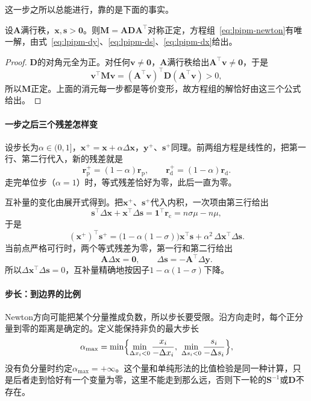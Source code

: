 这一步之所以总能进行，靠的是下面的事实。

\begin{lemma}[Newton方程可解]
\label{lem:lpipm-newton-solvable}
设$\bm{A}$满行秩，$\bm{x},\bm{s}>\bm{0}$。则$\bm{M}=\bm{A}\bm{D}\bm{A}^\top$对称正定，方程组~\eqref{eq:lpipm-newton}有唯一解，由式~\eqref{eq:lpipm-dy}、\eqref{eq:lpipm-ds}、\eqref{eq:lpipm-dx}给出。
\end{lemma}

\begin{proof}
$\bm{D}$的对角元全为正。对任何$\bm{v}\neq\bm{0}$，$\bm{A}$满行秩给出$\bm{A}^\top\bm{v}\neq\bm{0}$，于是
\[
 \bm{v}^\top\bm{M}\bm{v}=(\bm{A}^\top\bm{v})^\top\bm{D}(\bm{A}^\top\bm{v})>0,
\]
所以$\bm{M}$正定。上面的消元每一步都是等价变形，故方程组的解恰好由这三个公式给出。
\end{proof}

\paragraph{一步之后三个残差怎样变}
设步长为$\alpha\in(0,1]$，$\bm{x}^+=\bm{x}+\alpha\Delta\bm{x}$，$\bm{y}^+$、$\bm{s}^+$同理。前两组方程是线性的，把第一行、第二行代入，新的残差就是
\begin{equation}
 \bm{r}_{\mathrm{p}}^+=(1-\alpha)\bm{r}_{\mathrm{p}},\qquad\bm{r}_{\mathrm{d}}^+=(1-\alpha)\bm{r}_{\mathrm{d}}.
 \label{eq:lpipm-residual-update}
\end{equation}
走完单位步（$\alpha=1$）时，等式残差恰好为零，此后一直为零。

互补量的变化由展开式得到。把$\bm{x}^+$、$\bm{s}^+$代入内积，一次项由第三行给出
\[
 \bm{s}^\top\Delta\bm{x}+\bm{x}^\top\Delta\bm{s}=\bm{1}^\top\bm{r}_{\mathrm{c}}=n\sigma\mu-n\mu,
\]
于是
\begin{equation}
 (\bm{x}^+)^\top\bm{s}^+=\bigl(1-\alpha(1-\sigma)\bigr)\bm{x}^\top\bm{s}+\alpha^2\,\Delta\bm{x}^\top\Delta\bm{s}.
 \label{eq:lpipm-comp-update}
\end{equation}
当前点严格可行时，两个等式残差为零，第一行和第二行给出
\[
 \bm{A}\Delta\bm{x}=\bm{0},\qquad\Delta\bm{s}=-\bm{A}^\top\Delta\bm{y}.
\]
所以$\Delta\bm{x}^\top\Delta\bm{s}=0$，互补量精确地按因子$1-\alpha(1-\sigma)$下降。

\paragraph{步长：到边界的比例}
Newton方向可能把某个分量推成负数，所以步长要受限。沿方向走时，每个正分量到零的距离是确定的。定义能保持非负的最大步长
\begin{equation}
 \alpha_{\max}=\min\Bigl\{\min_{\Delta x_i<0}\frac{x_i}{-\Delta x_i},\ \min_{\Delta s_i<0}\frac{s_i}{-\Delta s_i}\Bigr\},
 \label{eq:lpipm-alpha-max}
\end{equation}
没有负分量时约定$\alpha_{\max}=+\infty$。这个量和单纯形法的比值检验是同一种计算，只是后者走到恰好有一个变量为零，这里不能走到那么远，否则下一轮的$\bm{S}^{-1}$或$\bm{D}$不存在。

